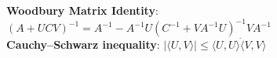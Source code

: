 \documentclass[11pt]{article}
\begin{document}
\textbf{Woodbury Matrix Identity}: $(A+UCV)^{-1} = A^{-1} - A^{-1}U(C^{-1}+VA^{-1}U)^{-1}VA^{-1}$\\
\textbf{Cauchy–Schwarz inequality}: $|\langle U, V \rangle| \leq \langle U, U\rangle \dot \langle V, V\rangle $\\
\end{document}
